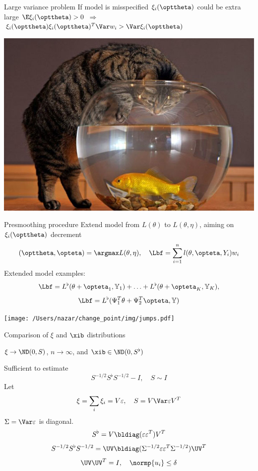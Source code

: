 \documentclass[9pt,english]{beamer}   %
\begin{document}
\begin{frame}{Large variance problem}
If model is misspecified $\xi_i(\opttheta)$ could be extra large
$ \E \xi_i(\opttheta) > 0 $ $\Rightarrow$ $ \xi_i(\opttheta) \xi_i(\opttheta)^T \Var w_i > \Var \xi_i(\opttheta) $

\begin{center}
\includegraphics[scale=0.4]{1722.jpg}
\end{center}

\end{frame}

\begin{frame}{Presmoothing procedure}
Extend model from $L(\theta)$ to $L(\theta, \eta)$, aiming on $\xi_i(\opttheta)$ decrement
\[
(\opttheta, \opteta) = \argmax L(\theta, \eta),
\quad
\Lbf = \sum_{i=1}^n  l(\theta, \opteta, Y_i) w_i
\]
Extended model examples:
\[
\Lbf  = L^{\flat}(\theta + \opteta_1, \mathbb{Y}_1) + \ldots + L^{\flat}(\theta + \opteta_K, \mathbb{Y}_K), 
\]   
\[
\Lbf  = L^{\flat}( \Psi_1^T \theta +  \Psi_2^T \opteta, \mathbb{Y})
\]
\begin{center}
\texttt{[image: /Users/nazar/change\_point/img/jumps.pdf]}
\end{center}

\end{frame}

\begin{frame}{Comparison of $\xi$ and $\xib$ distributions}

$\xi \to \ND(0, S)$, $n \to \infty$, and $\xib \in \ND(0, S^{\flat})$ 

Sufficient to estimate 
\[
S^{-1/2} S^{\flat}  S^{-1/2} - I, 
\quad
S \sim I
\] 
Let 
\[
\xi = \sum_i \xi_i  = V \varepsilon, 
\quad S = V \Var \varepsilon V^{T}
\]
$\Sigma = \Var \varepsilon$ is diagonal.
\[
S^{\flat} = V \bldiag(\varepsilon \varepsilon^{T}) V^{T}
\] 
\[
S^{-1/2} S^{\flat}  S^{-1/2} =  \UV \bldiag( \Sigma^{-1/2} \varepsilon \varepsilon^{T} \Sigma^{-1/2} ) \UV^T
\]
\[
\UV \UV^T = I, 
\quad \normp{ u_i } \leq \delta  
\]

\end{frame}
\end{document}
